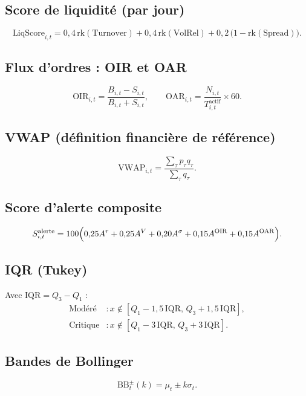 \subsection{Score de liquidité (par jour)}
\begin{equation}
\mathrm{LiqScore}_{i,t}
=
0{,}4\,\mathrm{rk}(\mathrm{Turnover})
+
0{,}4\,\mathrm{rk}(\mathrm{VolRel})
+
0{,}2\,\bigl(1-\mathrm{rk}(\mathrm{Spread})\bigr).
\end{equation}

\subsection{Flux d'ordres : OIR et OAR}
\begin{equation}
\mathrm{OIR}_{i,t}=\frac{B_{i,t}-S_{i,t}}{B_{i,t}+S_{i,t}},
\qquad
\mathrm{OAR}_{i,t}=\frac{N_{i,t}}{T^{\mathrm{actif}}_{i,t}}\times 60.
\end{equation}

\subsection{VWAP (définition financière de référence)}
\begin{equation}
\mathrm{VWAP}_{i,t}=\frac{\sum_{\tau} p_\tau q_\tau}{\sum_{\tau} q_\tau}.
\end{equation}

\subsection{Score d'alerte composite}
\begin{equation}
S^{\mathrm{alerte}}_{i,t}
=
100\Bigl(
0{,}25 A^{r}+0{,}25 A^{V}+0{,}20 A^{\sigma}+0{,}15 A^{\mathrm{OIR}}+0{,}15 A^{\mathrm{OAR}}
\Bigr).
\end{equation}

\subsection{IQR (Tukey)}
Avec $\mathrm{IQR}=Q_3-Q_1$ :
\begin{align}
\text{Modéré} &: x \notin [Q_1-1{,}5\,\mathrm{IQR},\, Q_3+1{,}5\,\mathrm{IQR}],\\
\text{Critique} &: x \notin [Q_1-3\,\mathrm{IQR},\, Q_3+3\,\mathrm{IQR}].
\end{align}

\subsection{Bandes de Bollinger}
\begin{equation}
\mathrm{BB}^{\pm}_{t}(k)=\mu_t \pm k\sigma_t.
\end{equation}

